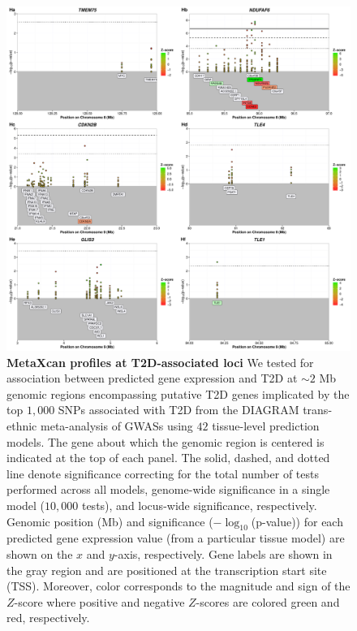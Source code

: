 \documentclass[10pt]{article}
\begin{document}
\begin{figure}
\ContinuedFloat
\includegraphics[width=\textwidth]{sup_fig1_part8_locusArray.pdf}
	\caption{\textbf{MetaXcan profiles at T2D-associated loci} We tested for association between predicted gene expression and T2D at $\sim2$ Mb genomic regions encompassing putative T2D genes implicated by the top $1,000$ SNPs associated with T2D from the DIAGRAM trans-ethnic meta-analysis of GWASs using $42$ tissue-level prediction models. The gene about which the genomic region is centered is indicated at the top of each panel. The solid, dashed, and dotted line denote significance correcting for the total number of tests performed across all models, genome-wide significance in a single model ($10,000$ tests), and locus-wide significance, respectively. Genomic position (Mb) and significance ($-\log_{10}$(p-value)) for each predicted gene expression value (from a particular tissue model) are shown on the $x$ and $y$-axis, respectively. Gene labels are shown in the gray region and are positioned at the transcription start site (TSS). Moreover, color corresponds to the magnitude and sign of the $Z$-score where positive and negative $Z$-scores are colored green and red, respectively.} 
    \label{fig:supp.locus_array_fig1_part8}
\end{figure}
\end{document}
